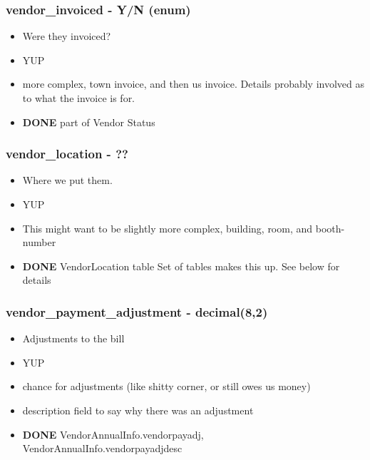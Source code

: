 \documentclass[captions=tablesignature]{scrartcl}
\begin{document}
\subsubsection{vendor\_invoiced - Y/N (enum)}
\label{sec-2-2-13}
\begin{itemize}
\item Were they invoiced?
\item YUP
\item more complex, town invoice, and then us invoice.  Details probably
involved as to what the invoice is for.
\end{itemize}
\begin{itemize}
\item {\bfseries\sffamily DONE} part of Vendor Status
\label{sec-2-2-13-1}
\end{itemize}

\subsubsection{vendor\_location - ??}
\label{sec-2-2-14}
\begin{itemize}
\item Where we put them.
\item YUP
\item This might want to be slightly more complex, building, room, and
booth-number
\end{itemize}
\begin{itemize}
\item {\bfseries\sffamily DONE} VendorLocation table
\label{sec-2-2-14-1}
Set of tables makes this up.  See below for details
\end{itemize}

\subsubsection{vendor\_payment\_adjustment - decimal(8,2)}
\label{sec-2-2-15}
\begin{itemize}
\item Adjustments to the bill
\item YUP
\item chance for adjustments (like shitty corner, or still owes us money)
\item description field to say why there was an adjustment
\end{itemize}
\begin{itemize}
\item {\bfseries\sffamily DONE} VendorAnnualInfo.vendorpayadj, VendorAnnualInfo.vendorpayadjdesc
\label{sec-2-2-15-1}
\end{itemize}
\end{document}
